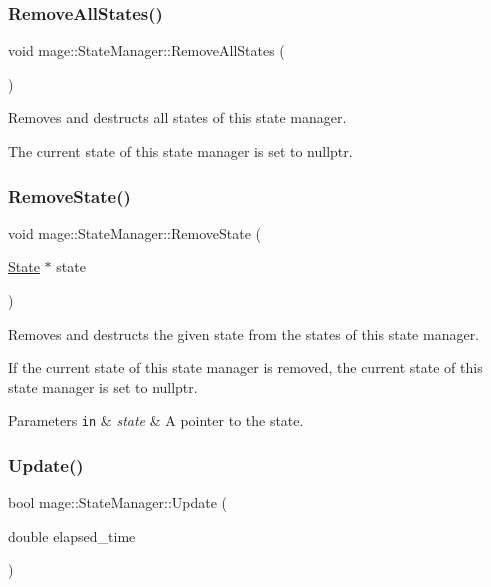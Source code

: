 \subsubsection{\texorpdfstring{Remove\+All\+States()}{RemoveAllStates()}}
{\footnotesize\ttfamily void mage\+::\+State\+Manager\+::\+Remove\+All\+States (\begin{DoxyParamCaption}{ }\end{DoxyParamCaption})}

Removes and destructs all states of this state manager.

The current state of this state manager is set to {\ttfamily nullptr}. \hypertarget{classmage_1_1_state_manager_ad1589f7792508f0568f673b925a2bdba}{}\label{classmage_1_1_state_manager_ad1589f7792508f0568f673b925a2bdba} 
\subsubsection{\texorpdfstring{Remove\+State()}{RemoveState()}}
{\footnotesize\ttfamily void mage\+::\+State\+Manager\+::\+Remove\+State (\begin{DoxyParamCaption}\item[{\hyperlink{classmage_1_1_state}{State} $\ast$}]{state }\end{DoxyParamCaption})}

Removes and destructs the given state from the states of this state manager.

If the current state of this state manager is removed, the current state of this state manager is set to {\ttfamily nullptr}.


\begin{DoxyParams}[1]{Parameters}
\mbox{\tt in}  & {\em state} & A pointer to the state. \\
\hline
\end{DoxyParams}
\hypertarget{classmage_1_1_state_manager_a48498596d478d107621b1752104e02e3}{}\label{classmage_1_1_state_manager_a48498596d478d107621b1752104e02e3} 
\subsubsection{\texorpdfstring{Update()}{Update()}}
{\footnotesize\ttfamily bool mage\+::\+State\+Manager\+::\+Update (\begin{DoxyParamCaption}\item[{double}]{elapsed\+\_\+time }\end{DoxyParamCaption})}

